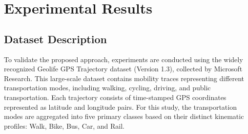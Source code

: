 \documentclass[conference]{IEEEtran}
\begin{document}


\section{Experimental Results}

\subsection{Dataset Description}
To validate the proposed approach, experiments are conducted using the widely recognized Geolife GPS Trajectory dataset (Version 1.3), collected by Microsoft Research. This large-scale dataset contains mobility traces representing different transportation modes, including walking, cycling, driving, and public transportation. Each trajectory consists of time-stamped GPS coordinates represented as latitude and longitude pairs. For this study, the transportation modes are aggregated into five primary classes based on their distinct kinematic profiles: Walk, Bike, Bus, Car, and Rail. 
\end{document}
